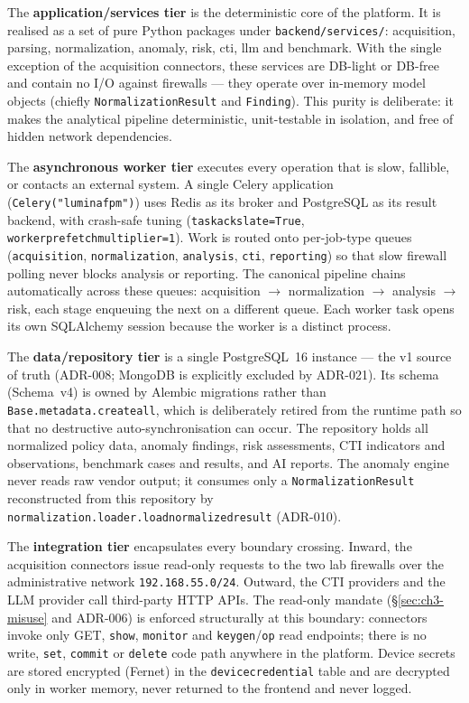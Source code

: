 \documentclass[12pt,a4paper]{report}
\renewcommand{\_}{\textunderscore\allowbreak}
\begin{document}
The \textbf{application/services tier} is the deterministic core of the platform. It is realised as a set of pure Python packages under \texttt{backend/services/}: acquisition, parsing, normalization, anomaly, risk, cti, llm and benchmark. With the single exception of the acquisition connectors, these services are DB-light or DB-free and contain no I/O against firewalls --- they operate over in-memory model objects (chiefly \texttt{NormalizationResult} and \texttt{Finding}). This purity is deliberate: it makes the analytical pipeline deterministic, unit-testable in isolation, and free of hidden network dependencies.

The \textbf{asynchronous worker tier} executes every operation that is slow, fallible, or contacts an external system. A single Celery application (\texttt{Celery("lumina\_fpm")}) uses Redis as its broker and PostgreSQL as its result backend, with crash-safe tuning (\texttt{task\_acks\_late=True}, \texttt{worker\_prefetch\_multiplier=1}). Work is routed onto per-job-type queues (\texttt{acquisition}, \texttt{normalization}, \texttt{analysis}, \texttt{cti}, \texttt{reporting}) so that slow firewall polling never blocks analysis or reporting. The canonical pipeline chains automatically across these queues: acquisition $\rightarrow$ normalization $\rightarrow$ analysis $\rightarrow$ risk, each stage enqueuing the next on a different queue. Each worker task opens its own SQLAlchemy session because the worker is a distinct process.

The \textbf{data/repository tier} is a single PostgreSQL~16 instance --- the v1 source of truth (ADR-008; MongoDB is explicitly excluded by ADR-021). Its schema (Schema~v4) is owned by Alembic migrations rather than \texttt{Base.metadata.create\_all}, which is deliberately retired from the runtime path so that no destructive auto-synchronisation can occur. The repository holds all normalized policy data, anomaly findings, risk assessments, CTI indicators and observations, benchmark cases and results, and AI reports. The anomaly engine never reads raw vendor output; it consumes only a \texttt{NormalizationResult} reconstructed from this repository by \texttt{normalization.loader.load\_normalized\_result} (ADR-010).

The \textbf{integration tier} encapsulates every boundary crossing. Inward, the acquisition connectors issue read-only requests to the two lab firewalls over the administrative network \texttt{192.168.55.0/24}. Outward, the CTI providers and the LLM provider call third-party HTTP APIs. The read-only mandate (\S\ref{sec:ch3-misuse} and ADR-006) is enforced structurally at this boundary: connectors invoke only GET, \texttt{show}, \texttt{monitor} and \texttt{keygen}/\texttt{op} read endpoints; there is no write, \texttt{set}, \texttt{commit} or \texttt{delete} code path anywhere in the platform. Device secrets are stored encrypted (Fernet) in the \texttt{device\_credential} table and are decrypted only in worker memory, never returned to the frontend and never logged.
\end{document}
